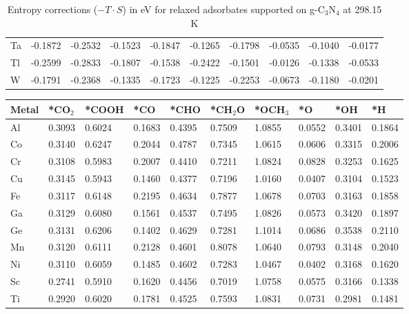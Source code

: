 \begin{table}[h]
{\begin{tabular}{*{10}{l}}
      Ta & -0.1872 & -0.2532 & -0.1523 & -0.1847 & -0.1265 & -0.1798 & -0.0535 & -0.1040 & -0.0177 \\
      Tl & -0.2599 & -0.2833 & -0.1807 & -0.1538 & -0.2422 & -0.1501 & -0.0126 & -0.1338 & -0.0533 \\
      W  & -0.1791 & -0.2368 & -0.1335 & -0.1723 & -0.1225 & -0.2253 & -0.0673 & -0.1180 & -0.0201 \\
      \hline
  \end{tabular}
  }
  \caption{Entropy corrections ($-T \cdot S$) in eV for relaxed adsorbates supported on g-C$_3$N$_4$ at 298.15 K}
  \label{si_table8:s_g-c3n4}
\end{table}


\begin{table}[h]
  \centering
  {\fontsize{6}{12}\selectfont
  \begin{tabular}{*{10}{l}}
      \hline
      Metal & *CO$_2$ & *COOH & *CO & *CHO   & *CH$_2$O & *OCH$_3$ & *O & *OH    & *H     \\
      \hline
      Al & 0.3093 & 0.6024 & 0.1683 & 0.4395 & 0.7509 & 1.0855 & 0.0552 & 0.3401 & 0.1864 \\
      Co & 0.3140 & 0.6247 & 0.2044 & 0.4787 & 0.7345 & 1.0615 & 0.0606 & 0.3315 & 0.2006 \\
      Cr & 0.3108 & 0.5983 & 0.2007 & 0.4410 & 0.7211 & 1.0824 & 0.0828 & 0.3253 & 0.1625 \\
      Cu & 0.3145 & 0.5943 & 0.1460 & 0.4377 & 0.7196 & 1.0160 & 0.0407 & 0.3104 & 0.1523 \\
      Fe & 0.3117 & 0.6148 & 0.2195 & 0.4634 & 0.7877 & 1.0678 & 0.0703 & 0.3163 & 0.1858 \\
      Ga & 0.3129 & 0.6080 & 0.1561 & 0.4537 & 0.7495 & 1.0826 & 0.0573 & 0.3420 & 0.1897 \\
      Ge & 0.3131 & 0.6206 & 0.1402 & 0.4629 & 0.7281 & 1.1014 & 0.0686 & 0.3538 & 0.2110 \\
      Mn & 0.3120 & 0.6111 & 0.2128 & 0.4601 & 0.8078 & 1.0640 & 0.0793 & 0.3148 & 0.2040 \\
      Ni & 0.3110 & 0.6059 & 0.1485 & 0.4602 & 0.7283 & 1.0467 & 0.0402 & 0.3168 & 0.1620 \\
      Sc & 0.2741 & 0.5910 & 0.1620 & 0.4456 & 0.7019 & 1.0758 & 0.0575 & 0.3166 & 0.1338 \\
      Ti & 0.2920 & 0.6020 & 0.1781 & 0.4525 & 0.7593 & 1.0831 & 0.0731 & 0.2981 & 0.1481 \\

\end{tabular}}
\end{table}
